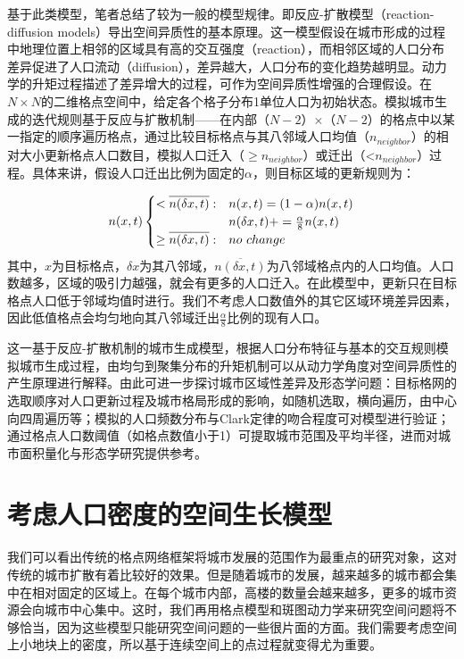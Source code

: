 基于此类模型，笔者总结了较为一般的模型规律。即反应-扩散模型（reaction-diffusion models）导出空间异质性的基本原理。这一模型假设在城市形成的过程中地理位置上相邻的区域具有高的交互强度（reaction），而相邻区域的人口分布差异促进了人口流动（diffusion），差异越大，人口分布的变化趋势越明显。动力学的升矩过程描述了差异增大的过程，可作为空间异质性增强的合理假设。在$N\times N$的二维格点空间中，给定各个格子分布1单位人口为初始状态。模拟城市生成的迭代规则基于反应与扩散机制——在内部（$N-2$）$\times$（$N-2$）的格点中以某一指定的顺序遍历格点，通过比较目标格点与其八邻域人口均值（$n_{neighbor}$）的相对大小更新格点人口数目，模拟人口迁入（$\geq n_{neighbor}$）或迁出（\textless$n_{neighbor}$）过程。具体来讲，假设人口迁出比例为固定的$\alpha$，则目标区域的更新规则为：

\begin{equation}
n(x,t) 
\begin{cases}
	<\overline{n(\delta x,t)}: & n(x,t)=(1-\alpha)n(x,t) \notag\\
	 & n(\delta x,t) += \frac{\alpha}{8}n(x,t)\notag\\
	\geq\overline{n(\delta x,t)}: & no\ change
\end{cases}
\end{equation}
其中，$x$为目标格点，$\delta x$为其八邻域，$\overline{n(\delta x,t)}$为八邻域格点内的人口均值。人口数越多，区域的吸引力越强，就会有更多的人口迁入。在此模型中，更新只在目标格点人口低于邻域均值时进行。我们不考虑人口数值外的其它区域环境差异因素，因此低值格点会均匀地向其八邻域迁出$\frac{\alpha}{8}$比例的现有人口。

这一基于反应-扩散机制的城市生成模型，根据人口分布特征与基本的交互规则模拟城市生成过程，由均匀到聚集分布的升矩机制可以从动力学角度对空间异质性的产生原理进行解释。由此可进一步探讨城市区域性差异及形态学问题：目标格网的选取顺序对人口更新过程及城市格局形成的影响，如随机选取，横向遍历，由中心向四周遍历等；模拟的人口频数分布与Clark定律的吻合程度可对模型进行验证；通过格点人口数阈值（如格点数值小于1）可提取城市范围及平均半径，进而对城市面积量化与形态学研究提供参考。


\section{考虑人口密度的空间生长模型}

我们可以看出传统的格点网络框架将城市发展的范围作为最重点的研究对象，这对传统的城市扩散有着比较好的效果。但是随着城市的发展，越来越多的城市都会集中在相对固定的区域上。在每个城市内部，高楼的数量会越来越多，更多的城市资源会向城市中心集中\cite{BerryThe}。这时，我们再用格点模型和斑图动力学来研究空间问题将不够恰当，因为这些模型只能研究空间问题的一些很片面的方面。我们需要考虑空间上小地块上的密度，所以基于连续空间上的点过程就变得尤为重要。

